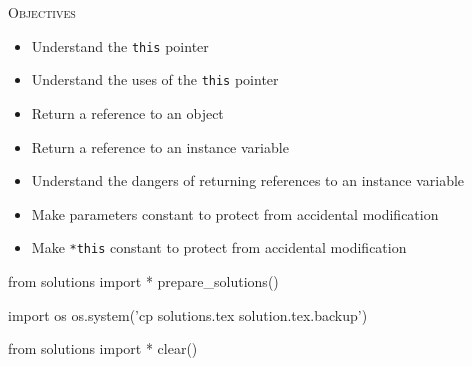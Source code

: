 
\textsc{Objectives}
\begin{itemize}
\item Understand the \texttt{this} pointer
\item Understand the uses of the \texttt{this} pointer
\item Return a reference to an object
\item Return a reference to an instance variable
\item Understand the dangers of returning references to an instance variable
\item Make parameters constant to protect from accidental modification
\item Make \texttt{*this} constant to protect from accidental modification
\end{itemize}

















\begin{python0}
from solutions import *
prepare_solutions()
\end{python0}
\begin{python}
import os
os.system('cp solutions.tex solution.tex.backup')  
\end{python}

\begin{python0}
from solutions import *
clear()
\end{python0}
